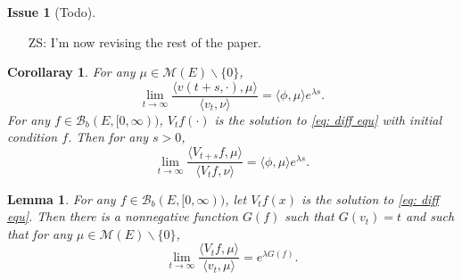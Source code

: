 \documentclass[12pt,a4paper]{amsart}
\numberwithin{equation}{section}
\theoremstyle{plain}
\newtheorem{lem}[thm]{Lemma}
\newtheorem{cor}[thm]{Corollaray}
\theoremstyle{definition}
\newtheorem{iss}{Issue}
\begin{document}
\begin{iss}[Todo]
  \begin{itemize}
  \item[ZS:]
I'm now revising the rest of the paper.
  \end{itemize}
\end{iss}

\begin{cor}\label{cor:general_rate}
	For any $\mu\in\mathcal M(E)\backslash\{0\}$,
  \begin{equation}\label{eq:ext_con}
    \lim_{t\rightarrow\infty}\frac{\langle v(t+s,\cdot),\mu\rangle }{\langle v_t,\nu\rangle }=\langle \phi,\mu\rangle e^{\lambda s}.
  \end{equation}
	For any $f\in\mathcal B_b(E,[0,\infty))$, $V_tf(\cdot)$ is the solution to \eqref{eq: diff equ} with initial condition $f$. Then for any $s>0$,
  \begin{equation}\label{eq:ratio_limits}
    \lim_{t\rightarrow\infty}\frac{\langle V_{t+s}f,\mu\rangle }{\langle V_{t}f,\nu\rangle }=\langle \phi,\mu\rangle e^{\lambda s}.
  \end{equation}
\end{cor}

\begin{lem}\label{eq:ratio_limits_2}
	For any $f\in\mathcal B_b(E,[0,\infty))$, let $V_tf(x)$ is the solution to \eqref{eq: diff equ}.  Then there is a nonnegative function $G(f)$ such that $G(v_t)=t$ and such that for any $\mu\in\mathcal M(E)\backslash\{0\}$,
  \begin{equation}\label{eq:app_of_G}
    \lim_{t\rightarrow\infty}\frac{\langle V_tf,\mu\rangle }{\langle v_t,\mu\rangle }=e^{\lambda G(f)}.
  \end{equation}
\end{lem}
\end{document}

